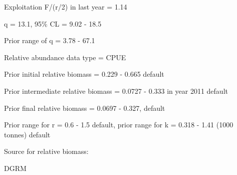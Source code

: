 \documentclass[12pt,a4paper]{article}\usepackage[]{graphicx}\usepackage[]{xcolor}
\begin{document}
Exploitation F/(r/2) in last year = 1.14

q = 13.1, 95\% CL = 9.02 - 18.5

Prior range of q = 3.78 - 67.1

Relative abundance data type = CPUE

Prior initial relative biomass = 0.229 - 0.665 default

Prior intermediate relative biomass = 0.0727 - 0.333 in year 2011 default

Prior final relative biomass = 0.0697 - 0.327, default

Prior range for r = 0.6 - 1.5 default, prior range for k = 0.318 - 1.41 (1000 tonnes) default

Source for relative biomass: 

DGRM

    
\end{document}
